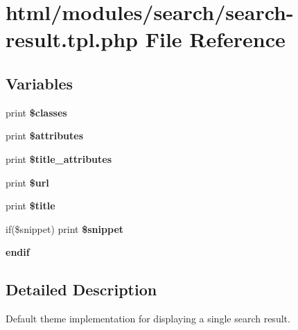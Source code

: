 \hypertarget{search-result_8tpl_8php}{
\section{html/modules/search/search-\/result.tpl.php File Reference}
\label{search-result_8tpl_8php}
}
\subsection*{Variables}
\begin{DoxyCompactItemize}
\item 
\hypertarget{search-result_8tpl_8php_a6d48ecbdbc70ca1812e665169b5fa1e2}{
print {\bfseries \$classes}}
\label{search-result_8tpl_8php_a6d48ecbdbc70ca1812e665169b5fa1e2}

\item 
\hypertarget{search-result_8tpl_8php_a9c88c4272fa40546577b45392a0b3cd3}{
print {\bfseries \$attributes}}
\label{search-result_8tpl_8php_a9c88c4272fa40546577b45392a0b3cd3}

\item 
\hypertarget{search-result_8tpl_8php_a938746e3da4238c45247505b2d7bd89f}{
print {\bfseries \$title\_\-attributes}}
\label{search-result_8tpl_8php_a938746e3da4238c45247505b2d7bd89f}

\item 
\hypertarget{search-result_8tpl_8php_ad6261d93a9597f207ed9f915d0296c35}{
print {\bfseries \$url}}
\label{search-result_8tpl_8php_ad6261d93a9597f207ed9f915d0296c35}

\item 
\hypertarget{search-result_8tpl_8php_aec2795512d255332f57cacd930a090b4}{
print {\bfseries \$title}}
\label{search-result_8tpl_8php_aec2795512d255332f57cacd930a090b4}

\item 
\hypertarget{search-result_8tpl_8php_aeb169dcd4a0f79968fef5c313a0e17cc}{
if(\$snippet) print {\bfseries \$snippet}}
\label{search-result_8tpl_8php_aeb169dcd4a0f79968fef5c313a0e17cc}

\item 
\hypertarget{search-result_8tpl_8php_a81c60d87f7d85467649ef1a23ca2ca36}{
{\bfseries endif}}
\label{search-result_8tpl_8php_a81c60d87f7d85467649ef1a23ca2ca36}

\end{DoxyCompactItemize}


\subsection{Detailed Description}
Default theme implementation for displaying a single search result.

